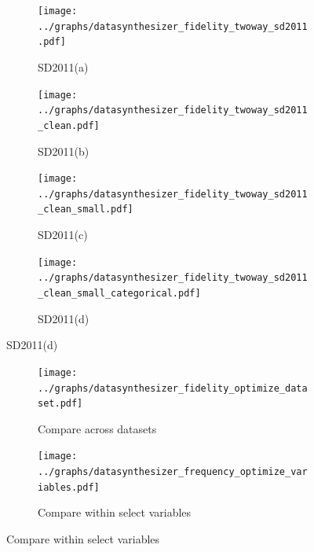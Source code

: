 \begin{figure}
  \caption{Datasynthesizer two-way correlation (SPECKS)}
  \label{fig:ds_fidelity_two_way}
  \centering

  \begin{subfigure}{0.45\textwidth}
    \texttt{[image: ../graphs/datasynthesizer\_fidelity\_twoway\_sd2011.pdf]}
    \caption{SD2011(a)}
    \label{fig:ds_fidelity_two_way_subfig-a}
  \end{subfigure}
  \hfill
  \begin{subfigure}{0.45\textwidth}
    \texttt{[image: ../graphs/datasynthesizer\_fidelity\_twoway\_sd2011\_clean.pdf]}
    \caption{SD2011(b)}
    \label{fig:ds_fidelity_two_way_subfig-b}
  \end{subfigure}

  \vspace{1em}

  \begin{subfigure}{0.45\textwidth}
    \texttt{[image: ../graphs/datasynthesizer\_fidelity\_twoway\_sd2011\_clean\_small.pdf]}
    \caption{SD2011(c)}
    \label{fig:ds_fidelity_two_way_subfig-c}
  \end{subfigure}
  \hfill
  \begin{subfigure}{0.45\textwidth}
    \texttt{[image: ../graphs/datasynthesizer\_fidelity\_twoway\_sd2011\_clean\_small\_categorical.pdf]}
    \caption{SD2011(d)}
    \label{fig:ds_fidelity_two_way_subfig-d}
  \end{subfigure}
\end{figure}

\begin{figure}[ht]
  \caption{Tuning DataSynthesizer}
  \label{fig:tuning_ds}
  \centering

  \begin{subfigure}{.75\textwidth}
    \texttt{[image: ../graphs/datasynthesizer\_fidelity\_optimize\_dataset.pdf]}
    \caption{Compare across datasets}
    \label{subfig:tuning_ds_dataset}
  \end{subfigure}


  \begin{subfigure}{.75\textwidth}
    \texttt{[image: ../graphs/datasynthesizer\_frequency\_optimize\_variables.pdf]}
    \caption{Compare within select variables}
    \label{subfig:tuning_ds_variables_within}
  \end{subfigure}
\end{figure}

